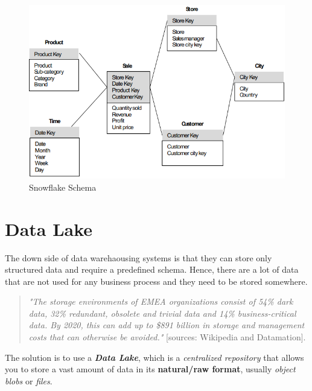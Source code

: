 \begin{figure}[ht!]
    \centering
    \includegraphics[scale=0.7]{images/DFM_snowflake_schema_2.png}
    \caption{Snowflake Schema}
    \label{figSnowflakeSchema}
\end{figure}

\section{Data Lake}

The down side of data warehaousing systems is that they can store only structured data and require a predefined schema. Hence, there are a lot of data that are not used for any business process and they need to be stored somewhere.
\begin{quote}
    \textit{"The storage environments of EMEA organizations consist of 54\% dark data, 32\% redundant, obsolete and trivial data and 14\% business-critical data. By 2020, this can add up to \$891 billion in storage and management costs that can otherwise be avoided."} [sources: Wikipedia and Datamation].
\end{quote}

The solution is to use a \textit{\textbf{Data Lake}}, which is a \textit{centralized repository} that allows you to store a vast amount of data in its \textbf{natural/raw format}, usually \textit{object blobs} or \textit{files}.